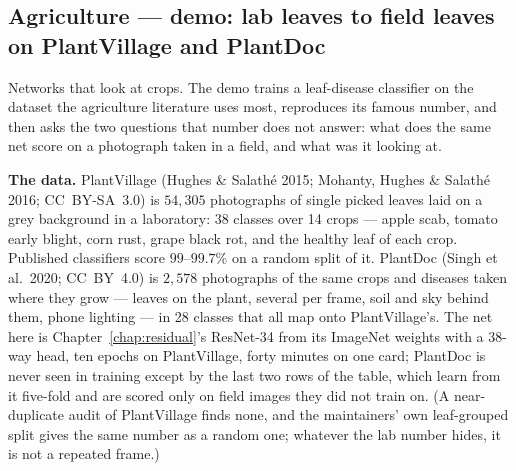 \subsection{Agriculture --- demo: lab leaves to field leaves on PlantVillage and PlantDoc}
\label{sec:bestiary_agriculture}

Networks that look at crops. The demo trains a leaf-disease classifier on
the dataset the agriculture literature uses most, reproduces its famous
number, and then asks the two questions that number does not answer: what
does the same net score on a photograph taken in a field, and what was it
looking at.

\textbf{The data.} PlantVillage (Hughes \& Salath\'e 2015; Mohanty, Hughes
\& Salath\'e 2016; CC~BY-SA~3.0) is $54{,}305$ photographs of single picked
leaves laid on a grey background in a laboratory: 38 classes over 14 crops
--- apple scab, tomato early blight, corn rust, grape black rot, and the
healthy leaf of each crop. Published classifiers score $99$--$99.7\%$ on a
random split of it. PlantDoc (Singh et al.\ 2020; CC~BY~4.0) is $2{,}578$
photographs of the same crops and diseases taken where they grow --- leaves
on the plant, several per frame, soil and sky behind them, phone lighting
--- in 28 classes that all map onto PlantVillage's. The net here is
Chapter~\ref{chap:residual}'s ResNet-34 from its ImageNet weights with a
38-way head, ten epochs on PlantVillage, forty minutes on one card; PlantDoc
is never seen in training except by the last two rows of the table, which
learn from it five-fold and are scored only on field images they did not
train on. (A near-duplicate audit of PlantVillage finds none, and the
maintainers' own leaf-grouped split gives the same number as a random one;
whatever the lab number hides, it is not a repeated frame.)

